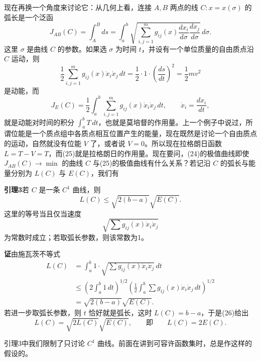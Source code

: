 现在再换一个角度来讨论它：从几何上看，连接 $A,B$ 两点的线 $C:x=x(\sigma)$ 的弧长是一个泛函
\begin{equation}
 J_{AB}(C)=\int_A^B ds
 =\int_a^b\sqrt{\sum_{i,j=1}^{m}g_{ij}(x)
 \frac{dx_i}{d\sigma}\frac{dx_j}{d\sigma}}\,d\sigma.
 \tag{24}
\end{equation}
这里 $\sigma$ 是曲线 $C$ 的参数。如果选 $\sigma$ 为时间 $t$，并设有一个单位质量的自由质点沿 $C$ 运动，则
\[
 \frac12\sum_{i,j=1}^{m}g_{ij}(x)\dot x_i\dot x_j\,dt
 =\frac12\cdot1\cdot\left(\frac{ds}{dt}\right)^2
 =\frac12mv^2
\]
是动能，而
\begin{equation}
 J_E(C)=\frac12\int_a^b\sum_{i,j=1}^{m}g_{ij}(x)\dot x_i\dot x_j\,dt,
 \qquad \dot x_i=\frac{dx_i}{dt},
 \tag{25}
\end{equation}
就是动能对时间的积分 $\int_a^bT\,dt$，也就是莫培督的作用量。上一个例子中说过，所谓位能是一个质点组中各质点相互位置产生的能量，现在既然是讨论一个自由质点的运动，自然就没有位能 $V$ 了，或者说 $V=0$。所以现在拉格朗日函数 $L=T-V=T$，而(25)就是拉格朗日的作用量。现在要问，(24)的极值曲线即使 $J_{AB}(C)\to\min$ 的曲线 $C$ 与(25)的极值曲线有什么关系？若记沿 $C$ 的弧长与能量分别为 $L(C)$ 与 $E(C)$，我们有

\noindent\textbf{引理3}\quad 若 $C$ 是一条 $C^1$ 曲线，则
\begin{equation}
 L(C)\le\sqrt{2(b-a)}\sqrt{E(C)}.
 \tag{26}
\end{equation}
这里的等号当且仅当速度
\[
 \sqrt{\sum g_{ij}(x)\dot x_i\dot x_j}
\]
为常数时成立；若取弧长参数，则该常数为1。

\noindent\textbf{证}\quad 由施瓦茨不等式
\begin{align*}
 L(C)
 &=\int_a^b 1\cdot\sqrt{\sum g_{ij}(x)\dot x_i\dot x_j}\,dt\\
 &\le\left(2\int_a^b1\,dt\right)^{1/2}
 \left(\frac12\int_a^b\sum g_{ij}(x)\dot x_i\dot x_j\,dt\right)^{1/2}\\
 &=\sqrt{2(b-a)}\sqrt{E(C)}.
\end{align*}
若进一步取弧长参数，则 $t$ 恰好就是弧长，这时 $L(C)=b-a$，于是(26)给出
\begin{equation}
 L(C)=\sqrt{2L(C)}\sqrt{E(C)},
 \qquad\text{即}\qquad L(C)=2E(C).
 \tag{27}
\end{equation}

引理3中我们限制了只讨论 $C^1$ 曲线。前面在讲到可容许函数集时，总是作这样的假设的。

